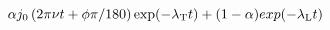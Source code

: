 \documentclass[12pt]{article}
\begin{document}
\begin{displaymath}
\alpha j_0\left(2\pi\nu t + \phi\pi/180\right) \exp(-\lambda_{\rm T} t) + (1-\alpha) exp(-\lambda_{\rm L} t)
\end{displaymath}
\end{document}

